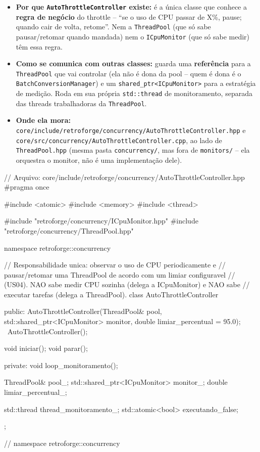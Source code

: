 \begin{itemize}
    \item \textbf{Por que \texttt{AutoThrottleController} existe:} é a única classe que conhece a \textbf{regra de negócio} do throttle -- ``se o uso de CPU passar de X\%, pause; quando cair de volta, retome''. Nem a \texttt{ThreadPool} (que só sabe pausar/retomar quando mandada) nem o \texttt{ICpuMonitor} (que só sabe medir) têm essa regra.
    \item \textbf{Como se comunica com outras classes:} guarda uma \textbf{referência} para a \texttt{ThreadPool} que vai controlar (ela não é dona da pool -- quem é dona é o \texttt{BatchConversionManager}) e um \texttt{shared\_ptr<ICpuMonitor>} para a estratégia de medição. Roda em sua própria \texttt{std::thread} de monitoramento, separada das threads trabalhadoras da \texttt{ThreadPool}.
    \item \textbf{Onde ela mora:} \texttt{core/include/retroforge/concurrency/AutoThrottleController.hpp} e \texttt{core/src/concurrency/AutoThrottleController.cpp}, ao lado de \texttt{ThreadPool.hpp} (mesma pasta \texttt{concurrency/}, mas fora de \texttt{monitors/} -- ela orquestra o monitor, não é uma implementação dele).
\end{itemize}

\begin{CaixaCodigo}
// Arquivo: core/include/retroforge/concurrency/AutoThrottleController.hpp
#pragma once

#include <atomic>
#include <memory>
#include <thread>

#include "retroforge/concurrency/ICpuMonitor.hpp"
#include "retroforge/concurrency/ThreadPool.hpp"

namespace retroforge::concurrency {

// Responsabilidade unica: observar o uso de CPU periodicamente e
// pausar/retomar uma ThreadPool de acordo com um limiar configuravel
// (US04). NAO sabe medir CPU sozinha (delega a ICpuMonitor) e NAO sabe
// executar tarefas (delega a ThreadPool).
class AutoThrottleController {
public:
    AutoThrottleController(ThreadPool& pool, std::shared_ptr<ICpuMonitor> monitor,
                            double limiar_percentual = 95.0);
    ~AutoThrottleController();

    void iniciar();
    void parar();

private:
    void loop_monitoramento();

    ThreadPool& pool_;
    std::shared_ptr<ICpuMonitor> monitor_;
    double limiar_percentual_;

    std::thread thread_monitoramento_;
    std::atomic<bool> executando_{false};
};

} // namespace retroforge::concurrency
\end{CaixaCodigo}

